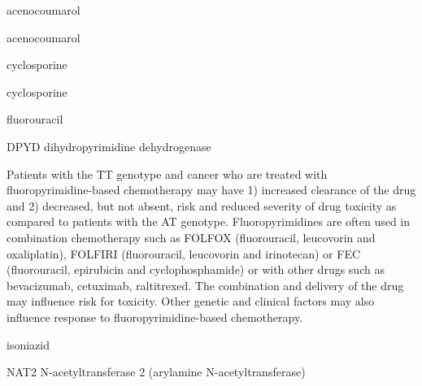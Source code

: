 \documentclass{resume} %
\begin{document}
\begin{rSection}{ acenocoumarol }
\begin{rSection}{ acenocoumarol }
\begin{rSection}{ cyclosporine }
\begin{rSection}{ cyclosporine }
\begin{rSection}{ fluorouracil }
\begin{rSubsection}{ DPYD }{ dihydropyrimidine dehydrogenase }{}{}
\item[] Patients with the TT genotype and cancer who are treated with fluoropyrimidine-based chemotherapy may have 1) increased clearance of the drug and 2) decreased, but not absent, risk and reduced severity of drug toxicity as compared to patients with the AT genotype. Fluoropyrimidines are often used in combination chemotherapy such as FOLFOX (fluorouracil, leucovorin and oxaliplatin), FOLFIRI (fluorouracil, leucovorin and irinotecan) or FEC (fluorouracil, epirubicin and cyclophosphamide) or with other drugs such as bevacizumab, cetuximab, raltitrexed. The combination and delivery of the drug may influence risk for toxicity. Other genetic and clinical factors may also influence response to fluoropyrimidine-based chemotherapy.

\end{rSubsection}

\end{rSection}\begin{rSection}{ isoniazid }
\item[]
\begin{rSubsection}{ NAT2 }{ N-acetyltransferase 2 (arylamine N-acetyltransferase) }{}{}
\item[]


\end{rSubsection}


\end{rSection}
\end{rSection}
\end{rSection}
\end{rSection}
\end{rSection}
\end{document}
